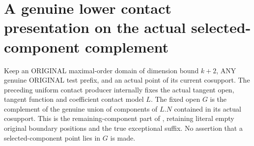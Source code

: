 \section{A genuine lower contact presentation on the actual selected-component complement}

Keep an ORIGINAL maximal-order domain of dimension bound $k+2$, ANY
genuine ORIGINAL test prefix, and an actual point of its current cosupport.
The preceding uniform contact producer internally fixes the actual tangent
open, tangent function and coefficient contact model $L$. The fixed open
$G$ is the complement of the genuine union of components of $L.N$
contained in its actual cosupport. This is the remaining-component part
of \cite[Step I, Case A]{bierstone-milman08-functoriality}, retaining
literal empty original boundary positions and the true exceptional suffix.
No assertion that a selected-component point lies in $G$ is made.

